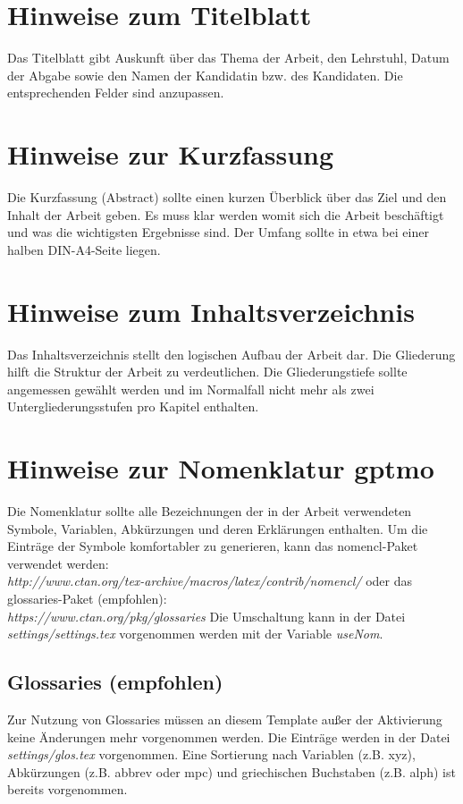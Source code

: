 \section{Hinweise zum Titelblatt}
\label{hinweise:titelblatt}

Das Titelblatt gibt Auskunft über das Thema der Arbeit, den
Lehrstuhl, Datum der Abgabe sowie den Namen der
Kandidatin bzw. des Kandidaten. Die entsprechenden Felder sind anzupassen.

\section{Hinweise zur Kurzfassung}
\label{hinweise:kurzfassung}

Die Kurzfassung (Abstract) sollte einen kurzen Überblick über das
Ziel und den Inhalt der Arbeit geben. Es muss klar werden womit sich 
die Arbeit beschäftigt und was die wichtigsten Ergebnisse sind. 
Der Umfang sollte in etwa bei einer halben DIN-A4-Seite liegen.

\section{Hinweise zum Inhaltsverzeichnis}
\label{hinweise:inhaltsverzeichnis}

Das Inhaltsverzeichnis stellt den logischen Aufbau der Arbeit dar.
Die Gliederung hilft die Struktur der Arbeit zu verdeutlichen. Die
Gliederungstiefe sollte angemessen gewählt werden und im
Normalfall nicht mehr als zwei Untergliederungsstufen pro Kapitel
enthalten.

\section{Hinweise zur Nomenklatur \gls{gptmo}}
\label{hinweise:nomenklatur}
Die Nomenklatur sollte alle Bezeichnungen der in der Arbeit verwendeten Symbole, Variablen, Abkürzungen und deren Erklärungen
enthalten. Um die Einträge der Symbole komfortabler zu generieren,
kann das nomencl-Paket verwendet werden: \\
\emph{http://www.ctan.org/tex-archive/macros/latex/contrib/nomencl/} oder das glossaries-Paket (empfohlen): \\ \emph{https://www.ctan.org/pkg/glossaries} 
Die Umschaltung kann in der Datei \textit{settings/settings.tex} vorgenommen werden mit der Variable \textit{useNom}.

\subsection*{Glossaries (empfohlen)}
Zur Nutzung von Glossaries müssen an diesem Template außer der Aktivierung keine Änderungen mehr vorgenommen werden. 
Die Einträge werden in der Datei \textit{settings/glos.tex} vorgenommen.
Eine Sortierung nach Variablen (z.B. \gls{xyz}), Abkürzungen (z.B. \gls{abbrev} oder \gls{mpc}) und griechischen Buchstaben (z.B. \gls{alph}) ist bereits vorgenommen.

